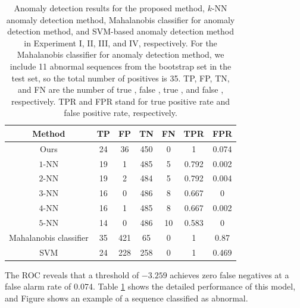\begin{table}[t]
  \caption[Anomaly detection results for the proposed method, $k$-NN
    anomaly detection method, Mahalanobis classifier for anomaly detection method, and
    SVM-based anomaly detection method in Experiment I, II, III, and
    IV, respectively.]{\small Anomaly detection results for the
    proposed method, $k$-NN anomaly detection method, Mahalanobis classifier for 
    anomaly detection method, and SVM-based anomaly detection method
    in Experiment I, II, III, and IV, respectively. For the Mahalanobis classifier for 
    anomaly detection method, we include 11 abnormal sequences from
    the bootstrap set in the test set, so the total number of
    positives is 35. TP, FP, TN, and FN are the number of true \DIFdelbeginFL {}\DIFdelendFL \DIFaddbeginFL {}\DIFaddendFL , 
    false \DIFdelbeginFL {}\DIFdelendFL \DIFaddbeginFL {}\DIFaddendFL , true \DIFdelbeginFL {}\DIFdelendFL \DIFaddbeginFL {}\DIFaddendFL , and false \DIFdelbeginFL {}\DIFdelendFL \DIFaddbeginFL {}\DIFaddendFL , respectively. 
    TPR and FPR stand for true positive rate and false positive rate, 
    respectively.}
  \begin{center}
    \begin{tabular}{c|c|c|c|c|c|c}
      \hline
      Method & TP & FP & TN & FN & TPR & FPR \\
      \hline\hline
      Ours & 24 & 36 & 450 & 0 & 1 & 0.074 \\ \hline
      $1$-NN & 19 & 1 & 485 & 5 & 0.792 & 0.002 \\ \hline
      $2$-NN & 19 & 2 & 484 & 5 & 0.792 & 0.004 \\ \hline
      $3$-NN & 16 & 0 & 486 & 8 & 0.667 & 0 \\ \hline
      $4$-NN & 16 & 1 & 485 & 8 & 0.667 & 0.002 \\ \hline
      $5$-NN & 14 & 0 & 486 & 10 & 0.583 & 0 \\ \hline
      Mahalanobis classifier & 35 & 421 & 65 & 0 & 1 & 0.87 \\ \hline
      SVM & 24 & 228 & 258 & 0 & 1 & 0.469 \\ \hline
    \end{tabular}
  \end{center}
  \label{tab:batch-detection-results}
\end{table}

The ROC reveals that a threshold of $-3.259$ achieves zero false
negatives at a false alarm rate of 0.074.
Table \ref{tab:batch-detection-results} shows the detailed performance
of this model, and Figure \DIFdelbegin \DIFdel{\ref{fig:batch-suspicious-behavior-detected}
}\DIFdelend \DIFaddbegin \DIFadd{\ref{fig:suspicious-behavior-detected}
}\DIFaddend shows an example of a sequence classified as abnormal\DIFdelbegin {}\DIFdelend . 


